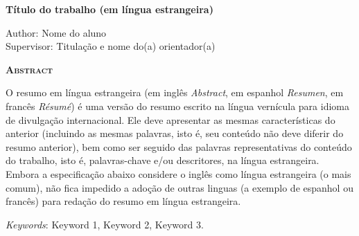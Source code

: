 \begin{center}
	{\Large{\textbf{Título do trabalho (em língua estrangeira)}}}
\end{center}

\vspace{1cm}

\begin{flushright}
	Author: Nome do aluno\\
	Supervisor: Titulação e nome do(a) orientador(a)
\end{flushright}

\vspace{1cm}

\begin{center}
	\Large{\textsc{\textbf{Abstract}}}
\end{center}

\noindent O resumo em língua estrangeira (em inglês \textit{Abstract}, em
espanhol \textit{Resumen}, em francês \textit{Résumé}) é uma versão do resumo
escrito na língua vernícula para idioma de divulgação internacional. Ele deve
apresentar as mesmas características do anterior (incluindo as mesmas palavras,
isto é, seu conteúdo não deve diferir do resumo anterior), bem como ser seguido
das palavras representativas do conteúdo do trabalho, isto é, palavras-chave
e/ou descritores, na língua estrangeira. Embora a especificação abaixo considere
o inglês como língua estrangeira (o mais comum), não fica impedido a adoção de
outras linguas (a exemplo de espanhol ou francês) para redação do resumo em
língua estrangeira.

\noindent\textit{Keywords}: Keyword 1, Keyword 2, Keyword 3.